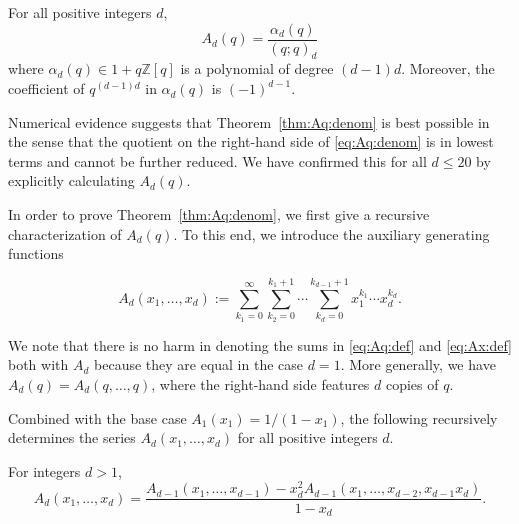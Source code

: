 \documentclass[11pt]{article}
\theoremstyle{plain}
\theoremstyle{definition}
\newcommand{\assign}{:=}
\begin{document}
\begin{theorem}
  \label{thm:Aq:denom}For all positive integers $d$,
  \begin{equation}
    A_d (q) = \frac{\alpha_d (q)}{(q ; q)_d} \label{eq:Aq:denom}
  \end{equation}
  where $\alpha_d (q) \in 1 + q\mathbb{Z} [q]$ is a polynomial of degree $(d -
  1) d$. Moreover, the coefficient of $q^{(d - 1) d}$ in $\alpha_d (q)$ is $(-
  1)^{d - 1}$.
\end{theorem}

Numerical evidence suggests that Theorem~\ref{thm:Aq:denom} is best possible
in the sense that the quotient on the right-hand side of \eqref{eq:Aq:denom}
is in lowest terms and cannot be further reduced. We have confirmed this for
all $d \leq 20$ by explicitly calculating $A_d (q)$.

In order to prove Theorem~\ref{thm:Aq:denom}, we first give a recursive
characterization of $A_d (q)$. To this end, we introduce the auxiliary
generating functions

\begin{equation}
  \label{eq:Ax:def} A_d (x_1, \ldots, x_d) \assign \sum_{k_1 = 0}^{\infty}
  \sum_{k_2 = 0}^{k_1 + 1} \cdots \sum_{k_d = 0}^{k_{d - 1} + 1} x_1^{k_1}
  \cdots x_d^{k_d} .
\end{equation}

We note that there is no harm in denoting the sums in \eqref{eq:Aq:def} and
\eqref{eq:Ax:def} both with $A_d$ because they are equal in the case $d = 1$.
More generally, we have $A_d (q) = A_d (q, \ldots, q)$, where the right-hand
side features $d$ copies of $q$.

Combined with the base case $A_1 (x_1) = 1 / (1 - x_1)$, the following
recursively determines the series $A_d (x_1, \ldots, x_d)$ for all positive
integers $d$.

\begin{lemma}
  \label{lem:Ax:rec}For integers $d > 1$,
  \begin{equation}
    A_d (x_1, \ldots, x_d) = \frac{A_{d - 1} (x_1, \ldots, x_{d - 1}) - x_d^2
    A_{d - 1} (x_1, \ldots, x_{d - 2}, x_{d - 1} x_d)}{1 - x_d} .
    \label{eq:Ax:rec}
  \end{equation}
\end{lemma}
\end{document}
